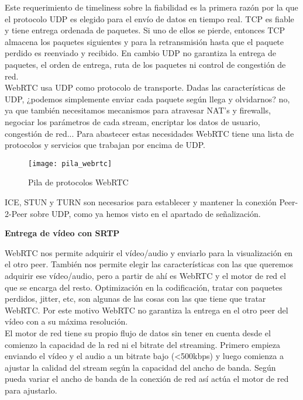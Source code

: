 Este requerimiento de timeliness sobre la fiabilidad es la primera razón por la que el protocolo UDP es elegido para el envío de datos en tiempo real. TCP es fiable y tiene entrega ordenada de paquetes. Si uno de ellos se pierde, entonces TCP almacena los paquetes siguientes y para la retransmisión hasta que el paquete perdido es reenviado y recibido. En cambio UDP no garantiza la entrega de paquetes, el orden de entrega, ruta de los paquetes ni control de congestión de red.\\

WebRTC usa UDP como protocolo de transporte. Dadas las características de UDP, ¿podemos simplemente enviar cada paquete según llega y olvidarnos? no, ya que también necesitamos mecanismos para atravesar NAT's y firewalls, negociar los parámetros de cada stream, encriptar los datos de usuario, congestión de red... Para abastecer estas necesidades WebRTC tiene una lista de protocolos y servicios que trabajan por encima de UDP.\\

\begin{figure}[htb]
\centering
\texttt{[image: pila\_webrtc]}
\caption{Pila de protocolos WebRTC}
\label{fig:pila_webrtc}
\end{figure}


ICE, STUN y TURN son necesarios para establecer y mantener la conexión Peer-2-Peer sobre UDP, como ya hemos visto en el apartado de señalización.\\

\begin{normalsize}
\noindent \textbf{Entrega de vídeo con SRTP}\\
\end{normalsize}

WebRTC nos permite adquirir el vídeo/audio y enviarlo para la visualización en el otro peer. También nos permite elegir las características con las que queremos adquirir ese vídeo/audio, pero a partir de ahí es WebRTC y el motor de red el que se encarga del resto. Optimización en la codificación, tratar con paquetes perdidos, jitter, etc, son algunas de las cosas con las que tiene que tratar WebRTC. Por este motivo WebRTC no garantiza la entrega en el otro peer del vídeo con a su máxima resolución.\\

El motor de red tiene su propio flujo de datos sin tener en cuenta desde el comienzo la capacidad de la red ni el bitrate del streaming. Primero empieza enviando el vídeo y el audio a un bitrate bajo (<500kbps) y luego comienza a ajustar la calidad del stream según la capacidad del ancho de banda. Según pueda variar el ancho de banda de la conexión de red así actúa el motor de red para ajustarlo.\\

